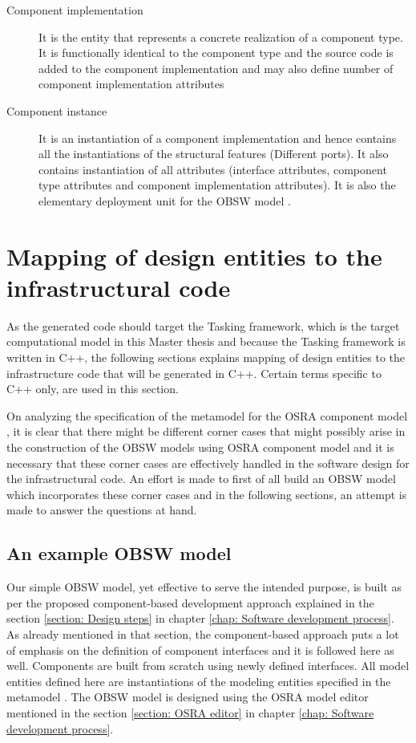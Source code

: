 \begin{description}
\item [Component implementation] It is the entity that represents a concrete realization of a component type. It is functionally identical to the component type and the source code is added to the component implementation and may also define number of component implementation attributes

\item [Component instance] It is an instantiation of a component implementation and hence contains all the instantiations of the structural features (Different ports). It also contains instantiation of all attributes (interface attributes, component type attributes and component implementation attributes). It is also the elementary deployment unit for the OBSW model \cite{SpecMetamodel}.        
\end{description}

\section{Mapping of design entities to the infrastructural code}
As the generated code should target the Tasking framework, which is the target computational model in this Master thesis and because the Tasking framework is written in C++, the following sections explains mapping of design entities to the infrastructure code that will be generated in C++. Certain terms specific to C++ only, are used in this section.

On analyzing the specification of the metamodel for the OSRA component model \cite{SpecMetamodel}, it is clear that there might be different corner cases that might possibly arise in the construction of the OBSW models using OSRA component model and it is necessary that these corner cases are effectively handled in the software design for the infrastructural code. An effort is made to first of all build an OBSW model which incorporates these corner cases and in the following sections, an attempt is made to answer the questions at hand.

\subsection{An example OBSW model}
Our simple OBSW model, yet effective to serve the intended purpose, is built as per the proposed component-based development approach explained in the section \cref{section: Design steps} in chapter \cref{chap: Software development process}. As already mentioned in that section, the component-based approach puts a lot of emphasis on the definition of component interfaces \cite{CompBasedProcess} and it is followed here as well. Components are built from scratch using newly defined interfaces. All model entities defined here are instantiations of the modeling entities specified in the metamodel \cite{SpecMetamodel}. The OBSW model is designed using the OSRA model editor mentioned in the section \cref{section: OSRA editor} in chapter \cref{chap: Software development process}.

